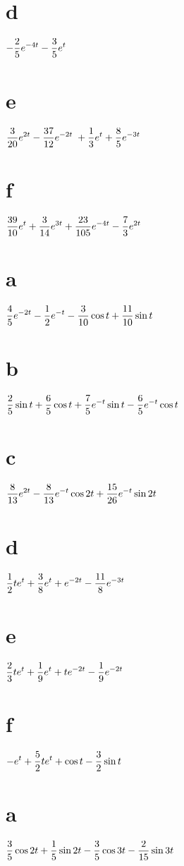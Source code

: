\smallskip
\quad\;
\part{d}  $\displaystyle{-\frac{2}{5}e^{-4t}-\frac{3}{5}e^{t}}$\;
 \part{e}  $\displaystyle{\frac{3}{20}e^{2t}-\frac{37}{12}e^{-2t}\;
+\frac{1}{3}e^{t}+\frac{8}{5}e^{-3t}}$
\part{f} $\displaystyle{\frac{39}{10}e^{t}+\frac{3}{14}e^{3t}+\frac{23}{105}e^{-4t}
-\frac{7}{3}e^{2t}}$\;

\smallskip

\;   \part{a}  $\displaystyle{\frac{4}{5}e^{-2t}-\frac{1}{2}e^{-t}-\frac{3}{10}\cos t}
+\frac{11}{10}\sin t$\;
 \part{b}  $\displaystyle{\frac{2}{5}\sin t+\frac{6}{5}\cos t
+\frac{7}{5}e^{-t}\sin t-\frac{6}{5}e^{-t}\cos t}$

\smallskip
\quad\;
\part{c}
$\displaystyle{\frac{8}{13}e^{2t}-\frac{8}{13}e^{-t}\cos2t+\frac{15}{26}
e^{-t}\sin2t}$\;
\part{d}  $\displaystyle{\frac{1}{2}te^{t}+\frac{3}{8}e^{t}+e^{-2t}
-\frac{11}{8}e^{-3t}}$

\smallskip
\quad\;
\part{e}  $\displaystyle{\frac{2}{3}te^{t}+\frac{1}{9}e^{t}
+te^{-2t}-\frac{1}{9}e^{-2t}}$
\part{f}
$\displaystyle{-e^{t}+\frac{5}{2}te^{t}+\cos t-\frac{3}{2}\sin t}$

\;
 \part{a} $\displaystyle{\frac{3}{5}\cos2t+\frac{1}{5}\sin2t
-\frac{3}{5}\cos3t-\frac{2}{15}\sin3t}$\;

